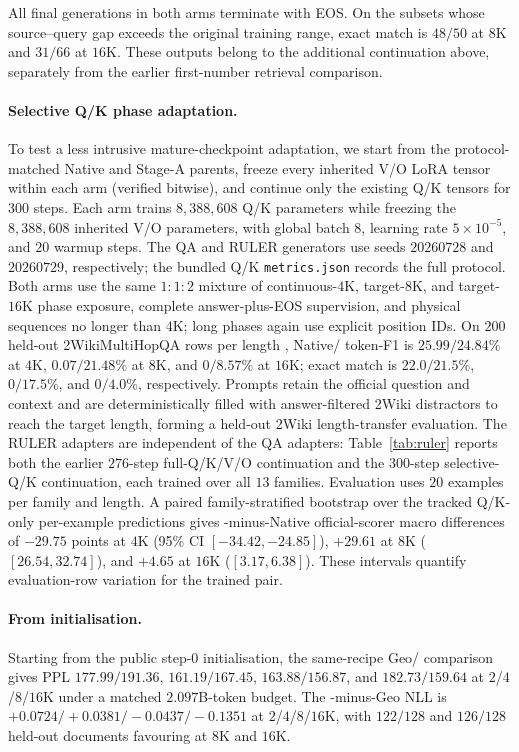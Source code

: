 All final generations in both arms terminate with EOS. On the \evq{} subsets
whose source--query gap exceeds the original training range, exact match is
$48/50$ at $8$K and $31/66$ at $16$K. These outputs belong to the
additional continuation above, separately from the earlier first-number
retrieval comparison.

\paragraph{Selective Q/K phase adaptation.}
To test a less intrusive mature-checkpoint adaptation, we start from the
protocol-matched Native and \evq{} Stage-A parents, freeze every inherited V/O
LoRA tensor within each arm (verified bitwise), and continue only the existing Q/K tensors for
$300$ steps. Each arm trains $8{,}388{,}608$ Q/K parameters while freezing the
$8{,}388{,}608$ inherited V/O parameters, with global batch $8$, learning rate
$5{\times}10^{-5}$, and $20$ warmup steps. The QA and RULER generators use
seeds $20260728$ and $20260729$, respectively; the bundled Q/K
\texttt{metrics.json} records the full protocol. Both arms use the same
$1{:}1{:}2$ mixture of continuous-$4$K,
target-$8$K, and target-$16$K phase exposure, complete answer-plus-EOS
supervision, and physical sequences no longer than $4$K; long phases again use
explicit position IDs. On $200$ held-out 2WikiMultiHopQA rows per length
\citep{ho2020twowiki},
Native/\evq{} token-F1 is $25.99/24.84\%$ at $4$K, $0.07/21.48\%$ at $8$K,
and $0/8.57\%$ at $16$K; exact match is $22.0/21.5\%$, $0/17.5\%$, and
$0/4.0\%$, respectively. Prompts retain the official question and context and are
deterministically filled with answer-filtered 2Wiki distractors to reach the
target length, forming a held-out 2Wiki length-transfer evaluation. The RULER adapters are independent of
the QA adapters: Table~\ref{tab:ruler} reports both the earlier $276$-step
full-Q/K/V/O continuation and the $300$-step selective-Q/K continuation, each
trained over all $13$ families. Evaluation uses $20$ examples per family and
length. A paired family-stratified bootstrap over the tracked Q/K-only
per-example predictions gives \evq{}-minus-Native official-scorer macro differences
of $-29.75$ points at $4$K (95\% CI $[-34.42,-24.85]$), $+29.61$ at $8$K
($[26.54,32.74]$), and $+4.65$ at $16$K ($[3.17,6.38]$). These intervals
quantify evaluation-row variation for the trained pair.


\FloatBarrier

\paragraph{From initialisation.}
Starting from the public step-$0$ initialisation, the same-recipe Geo/\evq{}
comparison gives PPL $177.99/191.36$, $161.19/167.45$,
$163.88/156.87$, and $182.73/159.64$ at $2$/$4$/$8$/$16$K under a matched
$2.097$B-token budget.
The \evq{}-minus-Geo NLL is
$+0.0724/+0.0381/-0.0437/-0.1351$ at $2$/$4$/$8$/$16$K, with
$122/128$ and $126/128$ held-out documents favouring \evq{} at $8$K and
$16$K.


